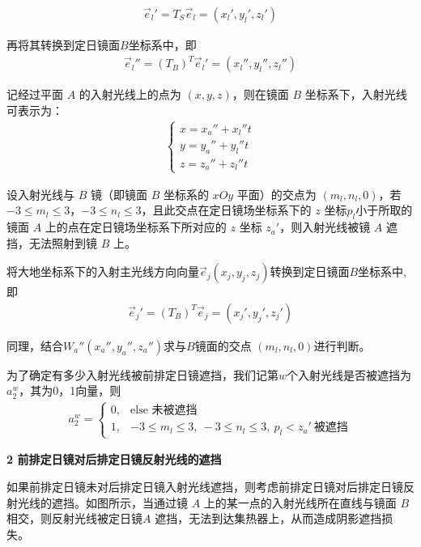 \documentclass[../main.tex]{subfiles}
\begin{document}
\begin{align}    \label{1.32}
\vec{e}_l'=T_S\vec{e}_l=\left( x_l',y_l',z_l' \right) 
\end{align}
\par 再将其转换到定日镜面$B$坐标系中，即
\begin{align} \label{1.33}
  \vec{e}_l'' = (T_B)^T \vec{e}_l' = (x_l'', y_l'', z_l'')
\end{align}
 \par 记经过平面 $A$ 的入射光线上的点为 $(x, y, z)$，则在镜面 $B$ 坐标系下，入射光线可表示为：
\begin{align} \label{1.34}
 \begin{cases}
x = x_a'' + x_l'' t \\
y = y_a'' + y_l'' t \\
z = z_a'' + z_l'' t
\end{cases}
\end{align}
\par 设入射光线与 $B$ 镜（即镜面 $B$ 坐标系的 $xOy$ 平面）的交点为 $(m_l, n_l, 0)$，若 $-3 \leq m_l \leq 3$，$-3 \leq n_l \leq 3$，且此交点在定日镜场坐标系下的 $z$ 坐标$p_l$小于所取的镜面 $A$ 上的点在定日镜场坐标系下所对应的 $z$ 坐标 $z_a'$，则入射光线被镜 \( A \) 遮挡，无法照射到镜 \( B \) 上。
\par 将大地坐标系下的入射主光线方向向量$\vec{e}_j (x_j, y_j, z_j)$转换到定日镜面$B$坐标系中,即
\begin{align}    \label{1.32}
\vec{e}_j'=(T_B)^T\vec{e}_j=\left( x_j',y_j',z_j' \right) 
\end{align}
\par 同理，结合$ W_a''(x_a'', y_a'', z_a'')$求与$B$镜面的交点 $(m_l, n_l, 0)$进行判断。
\par 为了确定有多少入射光线被前排定日镜遮挡，我们记第$w$个入射光线是否被遮挡为$a_2^w$，其为0，1向量，则
\begin{align}    \label{1.33}
a_2^w = 
\begin{cases} 
0, & \text{else 未被遮挡} \\
1, & -3 \leq m_l \leq 3,\ -3 \leq n_l \leq 3,\ p_l < z_a'\ \text{被遮挡} 
\end{cases}
 \end{align}
\par \textbf{2 前排定日镜对后排定日镜反射光线的遮挡}
\par  如果前排定日镜未对后排定日镜入射光线遮挡，则考虑前排定日镜对后排定日镜反射光线的遮挡。如图所示，当通过镜 $A$ 上的某一点的入射光线所在直线与镜面 $B$ 相交，则反射光线被定日镜$A$ 遮挡，无法到达集热器上，从而造成阴影遮挡损失。
\end{document}
